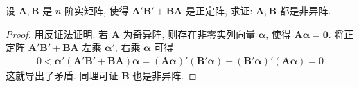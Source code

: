 \documentclass[../../main.tex]{subfiles}
\begin{document}
\begin{proposition}\label{proposition:两个正定阵和非异阵的关系}
设 \(\boldsymbol{A},\boldsymbol{B}\) 是 \(n\) 阶实矩阵, 使得 \(\boldsymbol{A}'\boldsymbol{B}'+\boldsymbol{B}\boldsymbol{A}\) 是正定阵, 求证: \(\boldsymbol{A},\boldsymbol{B}\) 都是非异阵.
\end{proposition}
\begin{proof}
用反证法证明. 若 \(\boldsymbol{A}\) 为奇异阵, 则存在非零实列向量 \(\boldsymbol{\alpha}\), 使得 \(\boldsymbol{A}\boldsymbol{\alpha}=\boldsymbol{0}\). 将正定阵 \(\boldsymbol{A}'\boldsymbol{B}'+\boldsymbol{B}\boldsymbol{A}\) 左乘 \(\boldsymbol{\alpha}'\), 右乘 \(\boldsymbol{\alpha}\) 可得
\begin{align*}
0<\boldsymbol{\alpha}'(\boldsymbol{A}'\boldsymbol{B}'+\boldsymbol{B}\boldsymbol{A})\boldsymbol{\alpha}=(\boldsymbol{A}\boldsymbol{\alpha})'(\boldsymbol{B}'\boldsymbol{\alpha})+(\boldsymbol{B}'\boldsymbol{\alpha})'(\boldsymbol{A}\boldsymbol{\alpha})= 0
\end{align*}
这就导出了矛盾. 同理可证 \(\boldsymbol{B}\) 也是非异阵. 
\end{proof}
\end{document}
